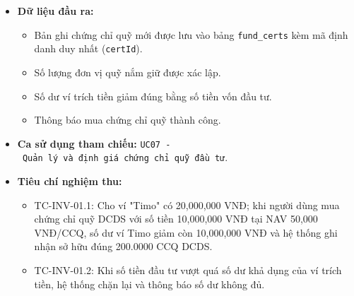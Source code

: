 \documentclass[11pt,a4paper]{article}
\providecommand{\tightlist}{
  \setlength{\itemsep}{0pt}\setlength{\parskip}{0pt}}
\begin{document}
\begin{itemize}
  \begin{itemize}
  \tightlist
  \item
    Kiểm tra số dư ví trích tiền theo \texttt{BR-FIN-02}:
    \(Balance_{wallet} - principal \ge 0\). Nếu không đủ số dư, từ chối
    lệnh mua.
  \item
    Trừ số vốn gốc \(principal\) khỏi số dư ví trích tiền.
  \item
    Tính toán số lượng chứng chỉ quỹ mua được (\(Units\)):
    \[Units = \frac{principal}{buyNav}\] Lưu trữ số lượng đơn vị quỹ với
    scale tối thiểu là 4 chữ số thập phân, sử dụng
    \texttt{RoundingMode.HALF\_EVEN}.
  \item
    Khởi tạo bản ghi đầu tư mới trong bảng \texttt{fund\_certs} với giá
    trị ban đầu \(Balance = principal\), trạng thái \texttt{HOLDING}.
  \item
    Gắn liên kết tài sản này vào quỹ mục tiêu chỉ định nếu có.
  \end{itemize}
\item
  \textbf{Dữ liệu đầu ra:}

  \begin{itemize}
  \tightlist
  \item
    Bản ghi chứng chỉ quỹ mới được lưu vào bảng \texttt{fund\_certs} kèm
    mã định danh duy nhất (\texttt{certId}).
  \item
    Số lượng đơn vị quỹ nắm giữ được xác lập.
  \item
    Số dư ví trích tiền giảm đúng bằng số tiền vốn đầu tư.
  \item
    Thông báo mua chứng chỉ quỹ thành công.
  \end{itemize}
\item
  \textbf{Ca sử dụng tham chiếu:}
  \texttt{UC07\ -\ Quản\ lý\ và\ định\ giá\ chứng\ chỉ\ quỹ\ đầu\ tư}.
\item
  \textbf{Tiêu chí nghiệm thu:}

  \begin{itemize}
  \tightlist
  \item
    TC-INV-01.1: Cho ví "Timo" có 20,000,000 VNĐ; khi người dùng mua
    chứng chỉ quỹ DCDS với số tiền 10,000,000 VNĐ tại NAV 50,000
    VNĐ/CCQ, số dư ví Timo giảm còn 10,000,000 VNĐ và hệ thống ghi nhận
    sở hữu đúng 200.0000 CCQ DCDS.
  \item
    TC-INV-01.2: Khi số tiền đầu tư vượt quá số dư khả dụng của ví trích
    tiền, hệ thống chặn lại và thông báo số dư không đủ.
  \end{itemize}
\end{itemize}
\end{document}

